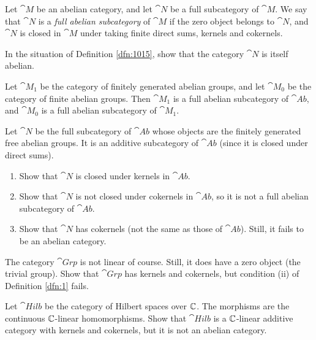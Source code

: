 \begin{dfn} \label{dfn:1015}
Let $\cat{M}$ be an abelian category, and let $\cat{N}$ be a full subcategory
of $\cat{M}$. We say that $\cat{N}$ is a 
{\em full abelian subcategory}%
of $\cat{M}$ if the zero object belongs to $\cat{N}$, and $\cat{N}$ is closed  
in $\cat{M}$ under taking finite direct sums, kernels and cokernels.
\end{dfn}

\begin{exer}
In the situation of Definition \ref{dfn:1015}, show that the category $\cat{N}$ 
is itself abelian.
\end{exer}

\begin{exa}
Let $\cat{M}_1$ be the category of finitely generated abelian groups,
and let $\cat{M}_0$ be the category of finite abelian groups. 
Then $\cat{M}_1$ is a full abelian subcategory of $\cat{Ab}$, and 
$\cat{M}_0$ is a full abelian subcategory of $\cat{M}_1$. 
\end{exa}

\begin{exer}
Let $\cat{N}$ be the full subcategory of $\cat{Ab}$ whose objects are the
finitely generated free abelian groups. It is an additive subcategory of
$\cat{Ab}$  (since it is closed under direct sums).
\begin{enumerate}
\item Show that $\cat{N}$ is closed under kernels in $\cat{Ab}$.

\item Show that $\cat{N}$ is not closed under cokernels in $\cat{Ab}$, so it 
is not a full abelian subcategory of $\cat{Ab}$.

\item Show that $\cat{N}$ has cokernels (not the same as those of $\cat{Ab}$).
Still, it fails to be an abelian category.
\end{enumerate}
\end{exer}

\begin{exer}
The category $\cat{Grp}$ is not linear of course. Still, it does have a 
zero object (the trivial group). Show that $\cat{Grp}$ has kernels and 
cokernels, but condition (ii) of Definition \ref{dfn:1} fails. 
\end{exer}

\begin{exer}
Let $\cat{Hilb}$ be the category of Hilbert spaces over $\mathbb{C}$. 
The morphisms are the continuous $\mathbb{C}$-linear homomorphisms. Show that 
$\cat{Hilb}$ is a $\mathbb{C}$-linear additive category with kernels and 
cokernels, 
but it is not an abelian category.
\end{exer}

